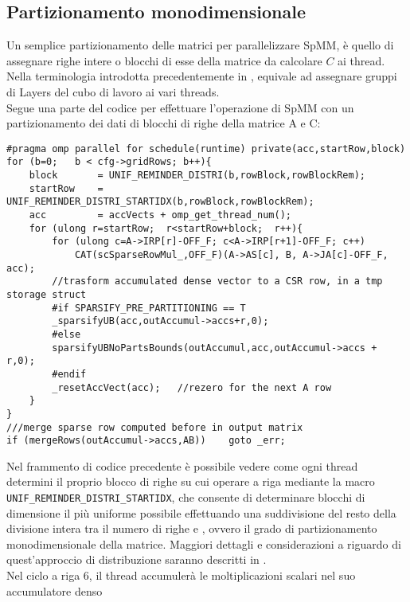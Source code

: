 \subsection{Partizionamento monodimensionale}
Un semplice partizionamento delle matrici per parallelizzare SpMM, è quello di 
assegnare righe intere o blocchi di esse della matrice da calcolare $C$ ai thread.\\
Nella terminologia introdotta precedentemente in , equivale ad
assegnare gruppi di Layers del cubo di lavoro ai vari threads.\\
Segue una parte del codice per effettuare l'operazione di SpMM con 
un partizionamento dei dati di blocchi di righe della matrice A e C:    \label{chSpMMNum:part1DGroup}
\begin{lstlisting}
#pragma omp parallel for schedule(runtime) private(acc,startRow,block)
for (b=0;   b < cfg->gridRows; b++){
    block       = UNIF_REMINDER_DISTRI(b,rowBlock,rowBlockRem);
    startRow    = UNIF_REMINDER_DISTRI_STARTIDX(b,rowBlock,rowBlockRem);
    acc         = accVects + omp_get_thread_num();
    for (ulong r=startRow;  r<startRow+block;  r++){
        for (ulong c=A->IRP[r]-OFF_F; c<A->IRP[r+1]-OFF_F; c++) 
            CAT(scSparseRowMul_,OFF_F)(A->AS[c], B, A->JA[c]-OFF_F, acc);
        //trasform accumulated dense vector to a CSR row, in a tmp storage struct
        #if SPARSIFY_PRE_PARTITIONING == T
        _sparsifyUB(acc,outAccumul->accs+r,0);
        #else
        sparsifyUBNoPartsBounds(outAccumul,acc,outAccumul->accs + r,0);
        #endif
        _resetAccVect(acc);   //rezero for the next A row
    }
} 
///merge sparse row computed before in output matrix
if (mergeRows(outAccumul->accs,AB))    goto _err;
\end{lstlisting}
Nel frammento di codice precedente è possibile vedere come ogni thread determini 
il proprio blocco di righe su cui operare a riga mediante la macro \\ \verb|UNIF_REMINDER_DISTRI_STARTIDX|,
che consente di determinare blocchi di dimensione il più uniforme possibile  
effettuando una suddivisione del resto della divisione intera tra il numero di righe e ,
ovvero il grado di partizionamento monodimensionale della matrice.
Maggiori dettagli e considerazioni a riguardo di quest'approccio di distribuzione saranno
descritti in .\\
Nel ciclo a riga 6, il thread accumulerà le moltiplicazioni scalari nel suo accumulatore denso
